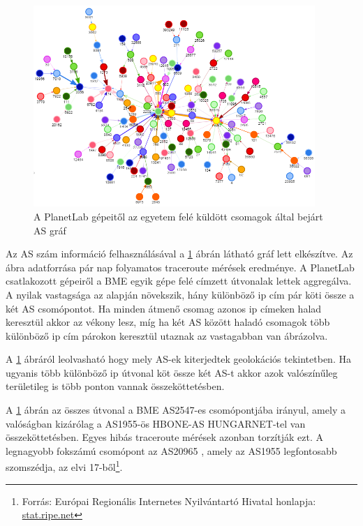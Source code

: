 \begin{figure}[h]
	\centering
	\includegraphics[width=0.95\textwidth, keepaspectratio]{figures/as-graph.png}
	\caption{A PlanetLab gépeitől az egyetem felé küldött csomagok által bejárt AS gráf}
	\label{fig:as-graph}
\end{figure}

Az AS szám információ felhasználásával a \ref{fig:as-graph} ábrán látható gráf lett elkészítve. Az ábra adatforrása pár nap folyamatos traceroute mérések eredménye. A PlanetLab csatlakozott gépeiről a BME egyik gépe felé címzett útvonalak lettek aggregálva. A nyilak vastagsága az alapján növekszik, hány különböző ip cím pár köti össze a két AS csomópontot. Ha minden átmenő csomag azonos ip címeken halad keresztül akkor az vékony lesz, míg ha két AS között haladó csomagok több különböző ip cím párokon keresztül utaznak az vastagabban van ábrázolva.

A \ref{fig:as-graph} ábráról leolvasható hogy mely AS-ek kiterjedtek geolokációs tekintetben. Ha ugyanis több különböző ip útvonal köt össze két AS-t akkor azok valószínűleg területileg is több ponton vannak összeköttetésben.

A \ref{fig:as-graph} ábrán az összes útvonal a BME AS2547-es csomópontjába irányul, amely a valóságban kizárólag a AS1955-ös HBONE-AS HUNGARNET-tel van összeköttetésben. Egyes hibás traceroute mérések azonban torzítják ezt. A legnagyobb fokszámú csomópont az AS20965 , amely az AS1955 legfontosabb szomszédja, az elvi 17-ből\footnote{Forrás: Európai Regionális Internetes Nyilvántartó Hivatal honlapja: \href{https://stat.ripe.net/widget/asn-neighbours\#w.resource=1955}{stat.ripe.net}}.